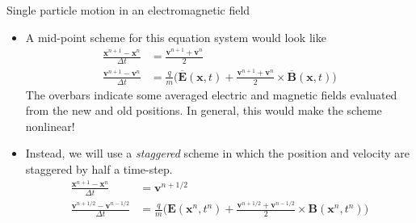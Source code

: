 \documentclass[pdf]{beamer}
\newcommand{\mvec}[1]{\mathbf{#1}}
\theoremstyle{definition}
\begin{document}
\begin{frame}{Single particle motion in an electromagnetic field}
  \small%
  \begin{itemize}
  \item A mid-point scheme for this equation system would look like
    \begin{align*}
    \frac{\mvec{x}^{n+1}-\mvec{x}^n}{\Delta t} &= \frac{\mvec{v}^{n+1}+\mvec{v}^n}{2} \\
    \frac{\mvec{v}^{n+1}-\mvec{v}^n}{\Delta t} &= \frac{q}{m}
      \big(
        \overline{\mvec{E}}(\mvec{x},t) +
        \frac{\mvec{v}^{n+1}+\mvec{v}^n}{2}\times\overline{\mvec{B}}(\mvec{x},t)
      \big)
    \end{align*}
    The overbars indicate some averaged electric and magnetic fields
    evaluated from the new and old positions. In general, this would
    make the scheme nonlinear!

  \item Instead, we will use a \emph{staggered} scheme in which the
    position and velocity are staggered by half a time-step.
    \begin{align*}
    \frac{\mvec{x}^{n+1}-\mvec{x}^n}{\Delta t} &= \mvec{v}^{n+1/2} \\
    \frac{\mvec{v}^{n+1/2}-\mvec{v}^{n-1/2}}{\Delta t} &= \frac{q}{m}
      \big(
        \mvec{E}(\mvec{x}^n,t^n) +
        \frac{\mvec{v}^{n+1/2}+\mvec{v}^{n-1/2}}{2}\times\mvec{B}(\mvec{x}^n,t^n)
      \big)
    \end{align*}
  \end{itemize}
\end{frame}
\end{document}
